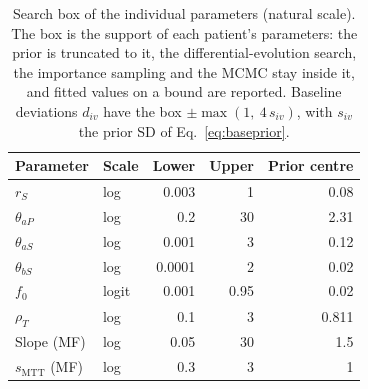 \begin{table}[!htbp]
\centering
\small
\setlength{\tabcolsep}{3.5pt}
\caption{Search box of the individual parameters (natural scale). The box is the support of each patient's parameters: the prior is truncated to it, the differential-evolution search, the importance sampling and the MCMC stay inside it, and fitted values on a bound are reported. Baseline deviations $d_{iv}$ have the box $\pm\max(1,\ 4\,s_{iv})$, with $s_{iv}$ the prior SD of Eq.~\ref{eq:baseprior}.}
\label{tab:box}
\begin{tabular}{llrrr}
\toprule
Parameter & Scale & Lower & Upper & Prior centre \\
\midrule
$r_S$ & log & 0.003 & 1 & 0.08 \\
$\theta_{aP}$ & log & 0.2 & 30 & 2.31 \\
$\theta_{aS}$ & log & 0.001 & 3 & 0.12 \\
$\theta_{bS}$ & log & 0.0001 & 2 & 0.02 \\
$f_0$ & logit & 0.001 & 0.95 & 0.02 \\
$\rho_T$ & log & 0.1 & 3 & 0.811 \\
Slope (MF) & log & 0.05 & 30 & 1.5 \\
$s_{\mathrm{MTT}}$ (MF) & log & 0.3 & 3 & 1 \\
\bottomrule
\end{tabular}
\end{table}
